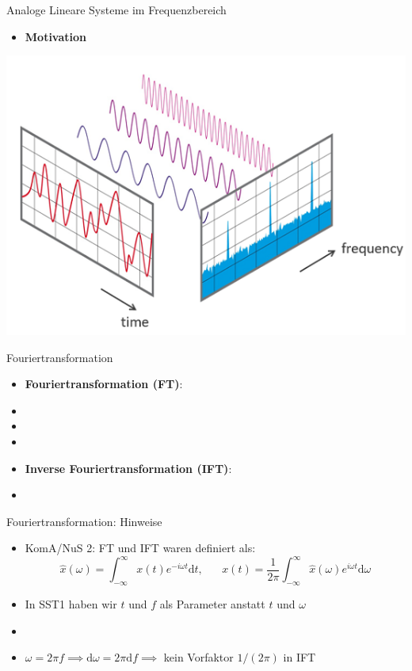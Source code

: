 \documentclass[14pt, aspectratio=169, handout]{beamer}
\begin{document}
\begin{frame}{Analoge Lineare Systeme im Frequenzbereich}
\begin{itemize}
    \item \textbf{Motivation}
\end{itemize}
\begin{center}
     \includegraphics[width=0.65\linewidth]{figures/Zeit_und_Frequenzbereich.png}
\end{center} 
\end{frame}

\begin{frame}{Fouriertransformation}
    \begin{itemize}
    \item \textbf{Fouriertransformation (FT)}:
    \item[] %
    \item[] 
    \item[] 
    \item \textbf{Inverse Fouriertransformation (IFT)}:
    \item[] %
\end{itemize}
\end{frame}

\begin{frame}{Fouriertransformation: Hinweise}
    \begin{itemize}
        \item KomA/NuS 2: FT und IFT waren definiert als:
$$\hat{x}(\omega) = \int_{-\infty}^{\infty} x(t) e^{-i\omega t}\text{d}t, \hspace{20pt} x(t)=\frac{1}{2\pi} \int_{-\infty}^{\infty} \hat{x}(\omega)e^{i\omega t} \text{d}\omega$$
    \item In SST1 haben wir $t$ und $f$ als Parameter  anstatt $t$ und $\omega$
    \item[] 
    \item $\omega = 2\pi f \implies \text{d}\omega = 2\pi \text{d}f \implies$ kein Vorfaktor $1/(2\pi)$ in IFT
    \end{itemize}
\end{frame}
\end{document}
